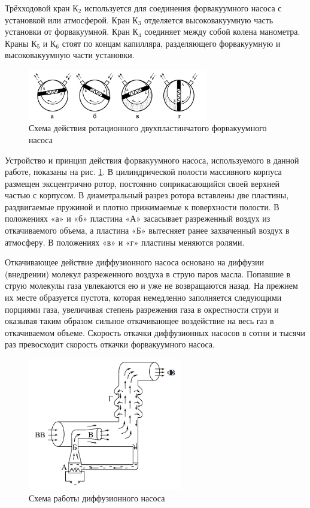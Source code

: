 \documentclass[a4paper,12pt]{article} %
\begin{document}
Трёхходовой кран $\text{К}_{2}$ используется для соединения форвакуумного насоса с установкой или атмосферой. Кран $\text{К}_3$ отделяется высоковакуумную часть установки от форвакуумной. Кран $\text{К}_4$ соединяет между собой колена манометра. Краны $\text{К}_5$ и $\text{К}_6$ стоят по концам капилляра, разделяющего форвакуумную и высоковакуумную части установки.

\begin{figure}
    \centering
    \includegraphics[width = 0.7\textwidth]{mechanic.PNG}
    \caption{Схема действия ротационного двухпластинчатого форвакуумного насоса}
    \label{fig:mechanic}
\end{figure}

Устройство и принцип действия форвакуумного насоса, используемого в данной работе, показаны на рис. \ref{fig:mechanic}. В цилиндрической полости массивного
корпуса размещен эксцентрично ротор, постоянно соприкасающийся своей верхней частью с корпусом. В диаметральный разрез ротора вставлены две пластины, раздвигаемые пружиной и плотно прижимаемые к поверхности полости. В положениях «а» и «б» пластина «А» засасывает разреженный воздух из откачиваемого объема, а пластина «Б» вытесняет ранее захваченный воздух в атмосферу. В положениях «в» и «г» пластины меняются ролями.

Откачивающее действие диффузионного насоса основано на диффузии (внедрении) молекул разреженного воздуха в струю паров масла. Попавшие в струю молекулы газа увлекаются ею и уже не возвращаются назад. На прежнем их месте образуется пустота, которая немедленно заполняется следующими порциями газа, увеличивая степень разрежения газа в окрестности струи и оказывая таким образом сильное откачивающее воздействие на весь газ в откачиваемом объеме. Скорость откачки диффузионных насосов в сотни и тысячи раз превосходит скорость откачки форвакуумного насоса.

\begin{figure}
    \centering
    \includegraphics[width = 0.6\textwidth]{diffusion.PNG}
    \caption{Схема работы диффузионного насоса}
    \label{fig:diffusion}
\end{figure}
\end{document}
